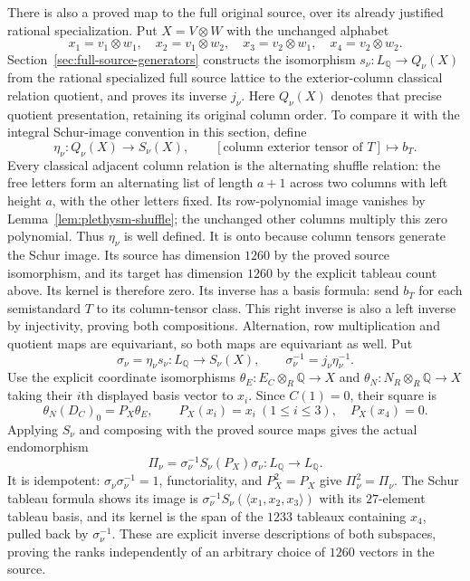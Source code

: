There is also a proved map to the full original source, over its
already justified rational specialization. Put
$X=V\otimes W$ with the unchanged alphabet
\[
 x_1=v_1\otimes w_1,\quad x_2=v_1\otimes w_2,\quad
 x_3=v_2\otimes w_1,\quad x_4=v_2\otimes w_2.
\]
Section~\ref{sec:full-source-generators} constructs the isomorphism
$s_\nu:L_{\mathbb Q}\to Q_\nu(X)$ from the rational specialized
full source lattice to the exterior-column classical relation quotient,
and proves its inverse $j_\nu$. Here $Q_\nu(X)$ denotes that precise
quotient presentation, retaining its original column order. To compare
it with the integral Schur-image convention in this section, define
\[
 \eta_\nu:Q_\nu(X)\longrightarrow S_\nu(X),\qquad
 [\text{column exterior tensor of }T]\longmapsto b_T.
\]
Every classical adjacent column relation is the alternating shuffle
relation: the free letters form an alternating list of length $a+1$
across two columns with left height $a$, with the other letters fixed.
Its row-polynomial image vanishes by
Lemma~\ref{lem:plethysm-shuffle}; the unchanged other columns multiply
this zero polynomial. Thus $\eta_\nu$ is well defined. It is onto
because column tensors generate the Schur image. Its source has
dimension $1260$ by the proved source isomorphism, and its target has
dimension $1260$ by the explicit tableau count above. Its kernel is
therefore zero. Its inverse has a basis formula: send $b_T$ for each
semistandard $T$ to its column-tensor class. This right inverse is
also a left inverse by injectivity, proving both compositions.
Alternation, row multiplication and quotient maps are equivariant,
so both maps are equivariant as well. Put
\[
 \sigma_\nu=\eta_\nu s_\nu:L_{\mathbb Q}\longrightarrow S_\nu(X),
 \qquad\sigma_\nu^{-1}=j_\nu\eta_\nu^{-1}.
\]
Use the explicit coordinate isomorphisms
$\theta_E:E_C\otimes_R\mathbb Q\to X$ and
$\theta_N:N_R\otimes_R\mathbb Q\to X$ taking their $i$th displayed
basis vector to $x_i$. Since $C(1)=0$, their square is
\[
 \theta_N(D_C)_0=P_X\theta_E,\qquad
 P_X(x_i)=x_i\ (1\le i\le3),\quad P_X(x_4)=0.
\]
Applying $S_\nu$ and composing with the proved source maps gives the
actual endomorphism
\begin{equation}\label{eq:plethysm-original-source-projector}
\Pi_\nu=\sigma_\nu^{-1} S_\nu(P_X)\sigma_\nu:
 L_{\mathbb Q}\longrightarrow L_{\mathbb Q}.
\end{equation}
It is idempotent: $\sigma_\nu\sigma_\nu^{-1}=1$, functoriality, and $P_X^2=P_X$
give $\Pi_\nu^2=\Pi_\nu$. The Schur tableau formula shows its image
is $\sigma_\nu^{-1}S_\nu(\langle x_1,x_2,x_3\rangle)$ with its $27$-element
tableau basis, and its kernel is the span
of the $1233$ tableaux containing $x_4$, pulled back by
$\sigma_\nu^{-1}$. These are explicit inverse
descriptions of both subspaces, proving the ranks independently of
an arbitrary choice of $1260$ vectors in the source.

